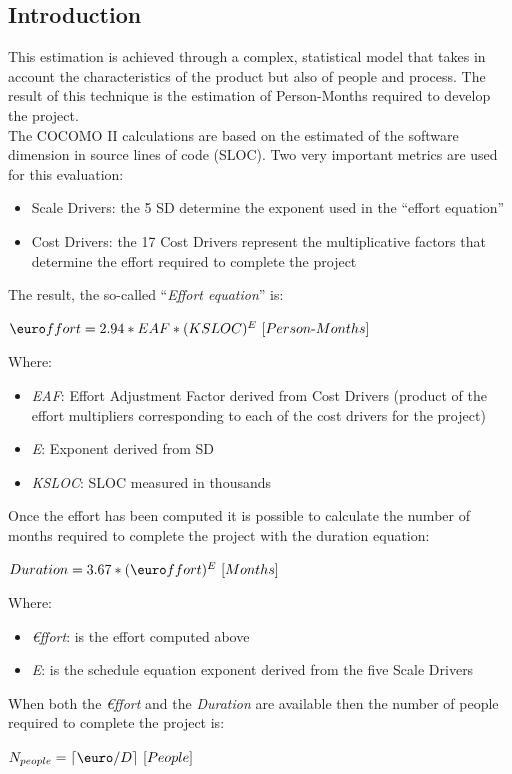 \documentclass[a4paper,11pt]{report} %
\begin{document}
		\subsection{Introduction}	
			This estimation is achieved through a complex, statistical model that takes in account the characteristics of the product but also of people and process. The result of this technique is the estimation of Person-Months required to develop the project.\\
			The COCOMO II calculations are based on the estimated of the software dimension in source lines of code (SLOC).
			Two very important metrics are used for this evaluation:
			\begin{itemize}
				\item Scale Drivers: the 5 SD determine the exponent used in the ``effort equation''
				\item Cost Drivers: the 17 Cost Drivers represent the multiplicative factors that determine the effort required to complete the project
			\end{itemize}
			The result, the so-called ``\textit{Effort equation}'' is:
			\begin{center}\($\euro$ffort = 2.94 * EAF * (KSLOC)^E \ [Person$-$Months]\)\end{center}
			Where:
			\begin{itemize}
				\item \textit{EAF}: Effort Adjustment Factor derived from Cost Drivers (product of the effort multipliers corresponding to each of the cost drivers for the project)
				\item \textit{E}: Exponent derived from SD
				\item \textit{KSLOC}: SLOC measured in thousands
			\end{itemize}
			Once the effort has been computed it is possible to calculate the number of months required to complete the project with the duration equation:
			\begin{center}\(Duration = 3.67 * ($\euro$ffort)^E \ [Months]\)\end{center}
			Where:
			\begin{itemize}
				\item \textit{\euro ffort}: is the effort computed above
				\item \textit{E}: is the schedule equation exponent derived from the five Scale Drivers
			\end{itemize}	
			When both the \textit{\euro ffort} and the \textit{Duration} are available then the number of people required to complete the project is:
			\begin{center}\(N_{people} = \lceil $\euro$ / D \rceil \ [People]\)\end{center}
\end{document}
